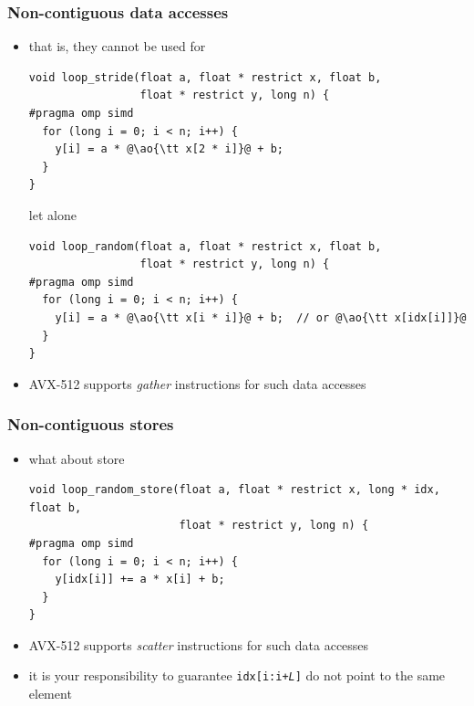 \documentclass[12pt,dvipdfmx]{beamer}
\newcommand{\ao}[1]{{\color{blue}#1}}
\begin{document}
\begin{frame}[fragile]
  \frametitle{Non-contiguous data accesses}
  \begin{itemize}
  \item that is, they cannot be used for
\begin{lstlisting}
void loop_stride(float a, float * restrict x, float b,
                 float * restrict y, long n) {
#pragma omp simd
  for (long i = 0; i < n; i++) {
    y[i] = a * @\ao{\tt x[2 * i]}@ + b;
  }
}
\end{lstlisting}
let alone
\begin{lstlisting}
void loop_random(float a, float * restrict x, float b,
                 float * restrict y, long n) {
#pragma omp simd
  for (long i = 0; i < n; i++) {
    y[i] = a * @\ao{\tt x[i * i]}@ + b;  // or @\ao{\tt x[idx[i]]}@
  }
}
\end{lstlisting}
\item AVX-512 supports \ao{\it gather} instructions for such data accesses
\end{itemize}
\end{frame}


\begin{frame}[fragile]
  \frametitle{Non-contiguous stores}
  \begin{itemize}
  \item what about store
\begin{lstlisting}
void loop_random_store(float a, float * restrict x, long * idx, float b,
                       float * restrict y, long n) {
#pragma omp simd
  for (long i = 0; i < n; i++) {
    y[idx[i]] += a * x[i] + b;
  }
}
\end{lstlisting}
\item AVX-512 supports \ao{\it scatter} instructions for such data accesses
\item it is your responsibility to guarantee {\tt idx[i:i+{\it L}]}
  do not point to the same element
\end{itemize}

\end{frame}
\end{document}
